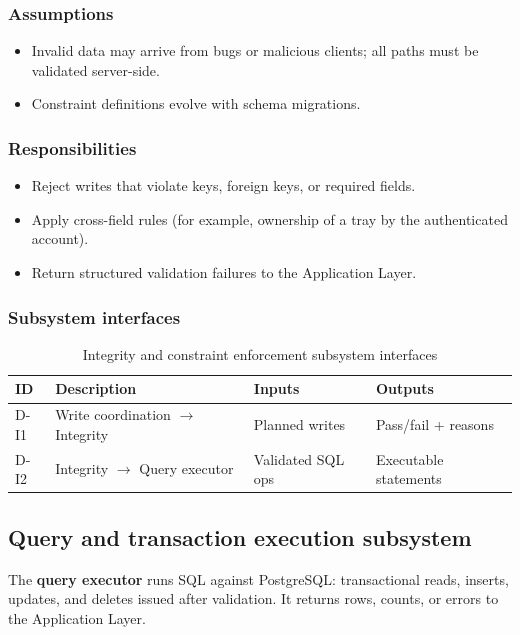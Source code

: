 \subsubsection{Assumptions}
\begin{itemize}
  \item Invalid data may arrive from bugs or malicious clients; all paths must be validated server-side.
  \item Constraint definitions evolve with schema migrations.
\end{itemize}

\subsubsection{Responsibilities}
\begin{itemize}
  \item Reject writes that violate keys, foreign keys, or required fields.
  \item Apply cross-field rules (for example, ownership of a tray by the authenticated account).
  \item Return structured validation failures to the Application Layer.
\end{itemize}

\subsubsection{Subsystem interfaces}
\begin{table}[H]
\centering
\small
\begin{tabular}{|p{0.85cm}|p{3.5cm}|p{3.0cm}|p{3.5cm}|}
\hline
\textbf{ID} & \textbf{Description} & \textbf{Inputs} & \textbf{Outputs} \\
\hline
D-I1 & Write coordination $\rightarrow$ Integrity & Planned writes & Pass/fail + reasons \\
\hline
D-I2 & Integrity $\rightarrow$ Query executor & Validated SQL ops & Executable statements \\
\hline
\end{tabular}
\caption{Integrity and constraint enforcement subsystem interfaces}
\end{table}

\subsection{Query and transaction execution subsystem}

The \textbf{query executor} runs SQL against PostgreSQL: transactional reads, inserts, updates, and deletes issued after validation. It returns rows, counts, or errors to the Application Layer.

